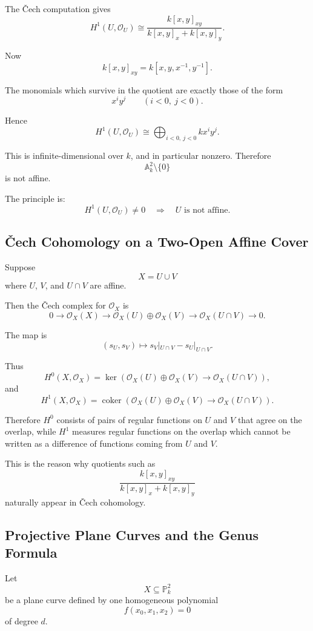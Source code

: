 \documentclass[12pt,a4paper]{article}
\theoremstyle{notespace}
\begin{document}
The \v{C}ech computation gives
\[
H^1(U,\mathcal O_U)
\cong
\frac{k[x,y]_{xy}}{k[x,y]_x+k[x,y]_y}.
\]

Now
\[
k[x,y]_{xy}=k[x,y,x^{-1},y^{-1}].
\]

The monomials which survive in the quotient are exactly those of the form
\[
x^iy^j
\qquad
(i<0,\ j<0).
\]

Hence
\[
H^1(U,\mathcal O_U)
\cong
\bigoplus_{i<0,\ j<0}kx^iy^j.
\]

This is infinite-dimensional over $k$, and in particular nonzero. Therefore
\[
\mathbb A_k^2\setminus\{0\}
\]
is not affine.

The principle is:
\[
\boxed{
	H^1(U,\mathcal O_U)\neq0
	\quad\Longrightarrow\quad
	U\text{ is not affine}.
}
\]

\subsection{\v{C}ech Cohomology on a Two-Open Affine Cover}

Suppose
\[
X=U\cup V
\]
where $U$, $V$, and $U\cap V$ are affine.

Then the \v{C}ech complex for $\mathcal O_X$ is
\[
0
\longrightarrow
\mathcal O_X(X)
\longrightarrow
\mathcal O_X(U)\oplus\mathcal O_X(V)
\longrightarrow
\mathcal O_X(U\cap V)
\longrightarrow 0.
\]

The map is
\[
(s_U,s_V)
\longmapsto
s_V|_{U\cap V}-s_U|_{U\cap V}.
\]

Thus
\[
H^0(X,\mathcal O_X)
=
\ker\left(
\mathcal O_X(U)\oplus\mathcal O_X(V)
\to
\mathcal O_X(U\cap V)
\right),
\]
and
\[
H^1(X,\mathcal O_X)
=
\operatorname{coker}\left(
\mathcal O_X(U)\oplus\mathcal O_X(V)
\to
\mathcal O_X(U\cap V)
\right).
\]

Therefore $H^0$ consists of pairs of regular functions on $U$ and $V$ that
agree on the overlap, while $H^1$ measures regular functions on the overlap
which cannot be written as a difference of functions coming from $U$ and $V$.

This is the reason why quotients such as
\[
\frac{k[x,y]_{xy}}{k[x,y]_x+k[x,y]_y}
\]
naturally appear in \v{C}ech cohomology.

\subsection{Projective Plane Curves and the Genus Formula}

Let
\[
X\subseteq \mathbb P_k^2
\]
be a plane curve defined by one homogeneous polynomial
\[
f(x_0,x_1,x_2)=0
\]
of degree $d$.
\end{document}
